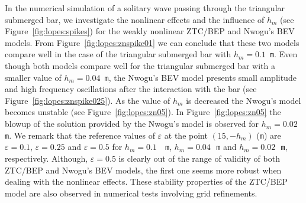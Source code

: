 In the numerical simulation of a solitary wave passing
through the triangular submerged bar, we investigate the
nonlinear effects and the influence of $h_m$ (see
Figure~\ref{fig:lopes:spikes}) for the weakly nonlinear
ZTC/BEP and Nwogu's BEV models.  From
Figure~\ref{fig:lopes:znspike01} we can conclude that these
two models compare well in the case of the triangular
submerged bar with $h_m=0.1$~{\tt m}.  Even though both
models compare well for the triangular submerged bar with a
smaller value of $h_m=0.04$~{\tt m}, the Nwogu's BEV model
presents small amplitude and high frequency oscillations
after the interaction with the bar (see
Figure~\ref{fig:lopes:znspike025}).
  As the value of $h_m$
is decreased the Nwogu's model becomes unstable (see
Figure~\ref{fig:lopes:zn05}).
In Figure~\ref{fig:lopes:zn05} the blowup of the solution
provided by the Nwogu's model is observed for $h_m=0.02$~{\tt
m}.  We remark that the reference values of
$\varepsilon$ at the point $(15,-h_m)$ ({\tt m}) are $\varepsilon=0.1$,
$\varepsilon=0.25$ and $\varepsilon=0.5$ for $h_m=0.1$~{\tt
m}, $h_m=0.04$\,~{\tt m} and $h_m=0.02$\,~{\tt m},
respectively. Although, $\varepsilon=0.5$ is clearly out of
the range of validity of both ZTC/BEP  and Nwogu's BEV models, the
first one seems more robust when dealing with the nonlinear
effects. These stability properties of the ZTC/BEP  model
are also observed in numerical tests involving grid refinements.

